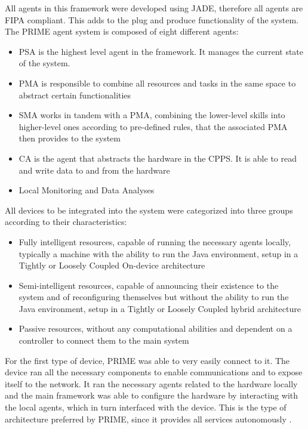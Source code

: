 All agents in this framework were developed using JADE, therefore all agents are \gls{FIPA} compliant. This adds to the plug and produce functionality of the system. The PRIME agent system is composed of eight different agents:
\begin{itemize}
	\item \gls{PSA} is the highest level agent in the framework. It manages the current state of the system.
	\item \gls{PMA} is responsible to combine all resources and tasks in the same space to abstract certain functionalities
	\item \gls{SMA} works in tandem with a \gls{PMA}, combining the lower-level skills into higher-level ones according to pre-defined rules, that the associated \gls{PMA} then provides to the system
	\item \gls{CA} is the agent that abstracts the hardware in the \gls{CPPS}. It is able to read and write data to and from the hardware
	\item Local Monitoring and Data Analyses
\end{itemize}

All devices to be integrated into the system were categorized into three groups according to their characteristics:
\begin{itemize}
	\item Fully intelligent resources, capable of running the necessary agents locally, typically a machine with the ability to run the Java environment, setup in a Tightly or Loosely Coupled On-device architecture
	\item Semi-intelligent resources, capable of announcing their existence to the system and of reconfiguring themselves but without the ability to run the Java environment, setup in a Tightly or Loosely Coupled hybrid architecture
	\item Passive resources, without any computational abilities and dependent on a controller to connect them to the main system  
\end{itemize}

For the first type of device, PRIME was able to very easily connect to it. The device ran all the necessary components to enable communications and to expose itself to the network. It ran the necessary agents related to the hardware locally and the main framework was able to configure the hardware by interacting with the local agents, which in turn interfaced with the device. This is the type of architecture preferred by PRIME, since it provides all services autonomously \cite{PRIME_plug_and_produce}.\\

